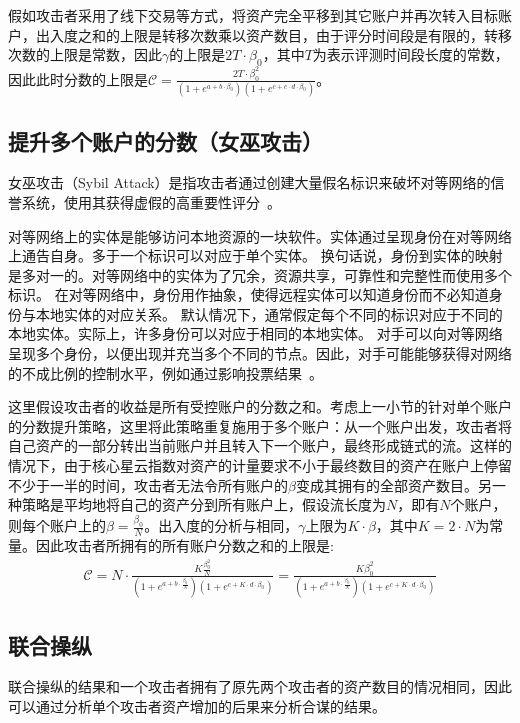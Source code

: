 假如攻击者采用了线下交易等方式，将资产完全平移到其它账户并再次转入目标账户，出入度之和的上限是转移次数乘以资产数目，由于评分时间段是有限的，转移次数的上限是常数，因此$\gamma$的上限是$2T \cdot \beta_0$，其中$T$为表示评测时间段长度的常数，因此此时分数的上限是$\mathcal{C} =  \frac{2T \cdot \beta_0 ^2}{ (1+e^{a + b \cdot \beta_0}) (1+e^{c + c \cdot d \cdot \beta_0})}$。

\subsection{提升多个账户的分数（女巫攻击）}
女巫攻击（Sybil Attack）是指攻击者通过创建大量假名标识来破坏对等网络的信誉系统，使用其获得虚假的高重要性评分~\cite{quercia2010sybil}。


对等网络上的实体是能够访问本地资源的一块软件。实体通过呈现身份在对等网络上通告自身。多于一个标识可以对应于单个实体。
换句话说，身份到实体的映射是多对一的。对等网络中的实体为了冗余，资源共享，可靠性和完整性而使用多个标识。
在对等网络中，身份用作抽象，使得远程实体可以知道身份而不必知道身份与本地实体的对应关系。
默认情况下，通常假定每个不同的标识对应于不同的本地实体。实际上，许多身份可以对应于相同的本地实体。
对手可以向对等网络呈现多个身份，以便出现并充当多个不同的节点。因此，对手可能能够获得对网络的不成比例的控制水平，例如通过影响投票结果~\cite{wiki:sybil}。


这里假设攻击者的收益是所有受控账户的分数之和。考虑上一小节的针对单个账户的分数提升策略，这里将此策略重复施用于多个账户：从一个账户出发，攻击者将自己资产的一部分转出当前账户并且转入下一个账户，最终形成链式的流。这样的情况下，由于核心星云指数对资产的计量要求不小于最终数目的资产在账户上停留不少于一半的时间，攻击者无法令所有账户的$\beta$变成其拥有的全部资产数目。另一种策略是平均地将自己的资产分到所有账户上，假设流长度为$N$，即有$N$个账户，则每个账户上的$\beta = \frac{\beta_0}{N}$。出入度的分析与相同，$\gamma$上限为$K \cdot \beta$，其中$K=2\cdot N$为常量。因此攻击者所拥有的所有账户分数之和的上限是:
\begin{align}
\mathcal{C} = N \cdot \frac{K \frac{\beta_0 ^2}{N}}{ (1+e^{a + b \cdot \frac{\beta_0}{N} }) (1+e^{c + K \cdot d \cdot \beta_0})} = \frac{K \beta_0 ^2 }{ (1+e^{a + b \cdot \frac{\beta_0}{N} }) (1+e^{c + K \cdot d \cdot \beta_0})} 
\end{align}


\subsection{联合操纵 \label{sec:coalition}}
联合操纵的结果和一个攻击者拥有了原先两个攻击者的资产数目的情况相同，因此可以通过分析单个攻击者资产增加的后果来分析合谋的结果。

